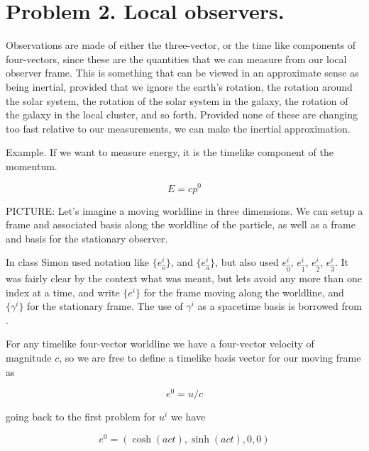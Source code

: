 \section{Problem 2.  Local observers.}

Observations are made of either the three-vector, or the time like components of four-vectors, since these are the quantities that we can measure from our local observer frame.  This is something that can be viewed in an approximate sense as being inertial, provided that we ignore the earth's rotation, the rotation around the solar system, the rotation of the solar system in the galaxy, the rotation of the galaxy in the local cluster, and so forth.  Provided none of these are changing too fast relative to our measurements, we can make the inertial approximation.

Example.  If we want to measure energy, it is the timelike component of the momentum.

\begin{equation}\label{eqn:relativisticElectrodynamicsT2:500}
E = c p^0
\end{equation}

PICTURE:  Let's imagine a moving worldline in three dimensions.  We can setup a frame and associated basis along the worldline of the particle, as well as a frame and basis for the stationary observer.

In class Simon used notation like $\{ e_{\hat{o}}^i \}$, and $\{ e_{\hat{a}}^i \}$, but also used $e_{\hat{0}}^i$, $e_{\hat{1}}^i$, $e_{\hat{2}}^i$, $e_{\hat{3}}^i$.  It was fairly clear by the context what was meant, but lets avoid any more than one index at a time, and write $\{ e^i \}$ for the frame moving along the worldline, and $\{ \gamma^i \}$ for the stationary frame.  The use of $\gamma^i$ as a spacetime basis is borrowed from \cite{doran2003gap}.

For any timelike four-vector worldline we have a four-vector velocity of magnitude $c$, so we are free to define a timelike basis vector for our moving frame as

\begin{equation}\label{eqn:relativisticElectrodynamicsT2:510}
e^0 = u / c
\end{equation}

going back to the first problem for $u^i$ we have

\begin{equation*}
e^0 = ( \cosh( a c t ), \sinh( a c t), 0, 0 ) 
\end{equation*}

